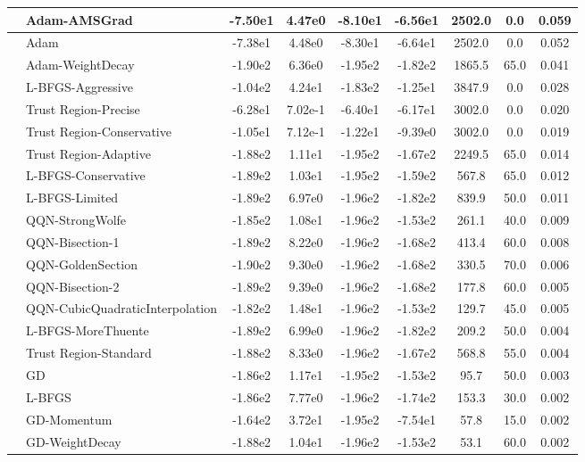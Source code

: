 \documentclass{article}
\begin{document}
\begin{longtable}{|l|l|c|c|c|c|c|c|c|}
\hline
 & Adam-AMSGrad & -7.50e1 & 4.47e0 & -8.10e1 & -6.56e1 & 2502.0 & 0.0 & 0.059 \\
\hline
 & Adam & -7.38e1 & 4.48e0 & -8.30e1 & -6.64e1 & 2502.0 & 0.0 & 0.052 \\
\hline
 & Adam-WeightDecay & -1.90e2 & 6.36e0 & -1.95e2 & -1.82e2 & 1865.5 & 65.0 & 0.041 \\
\hline
 & L-BFGS-Aggressive & -1.04e2 & 4.24e1 & -1.83e2 & -1.25e1 & 3847.9 & 0.0 & 0.028 \\
\hline
 & Trust Region-Precise & -6.28e1 & 7.02e-1 & -6.40e1 & -6.17e1 & 3002.0 & 0.0 & 0.020 \\
\hline
 & Trust Region-Conservative & -1.05e1 & 7.12e-1 & -1.22e1 & -9.39e0 & 3002.0 & 0.0 & 0.019 \\
\hline
 & Trust Region-Adaptive & -1.88e2 & 1.11e1 & -1.95e2 & -1.67e2 & 2249.5 & 65.0 & 0.014 \\
\hline
 & L-BFGS-Conservative & -1.89e2 & 1.03e1 & -1.95e2 & -1.59e2 & 567.8 & 65.0 & 0.012 \\
\hline
 & L-BFGS-Limited & -1.89e2 & 6.97e0 & -1.96e2 & -1.82e2 & 839.9 & 50.0 & 0.011 \\
\hline
 & QQN-StrongWolfe & -1.85e2 & 1.08e1 & -1.96e2 & -1.53e2 & 261.1 & 40.0 & 0.009 \\
\hline
 & QQN-Bisection-1 & -1.89e2 & 8.22e0 & -1.96e2 & -1.68e2 & 413.4 & 60.0 & 0.008 \\
\hline
 & QQN-GoldenSection & -1.90e2 & 9.30e0 & -1.96e2 & -1.68e2 & 330.5 & 70.0 & 0.006 \\
\hline
 & QQN-Bisection-2 & -1.89e2 & 9.39e0 & -1.96e2 & -1.68e2 & 177.8 & 60.0 & 0.005 \\
\hline
 & QQN-CubicQuadraticInterpolation & -1.82e2 & 1.48e1 & -1.96e2 & -1.53e2 & 129.7 & 45.0 & 0.005 \\
\hline
 & L-BFGS-MoreThuente & -1.89e2 & 6.99e0 & -1.96e2 & -1.82e2 & 209.2 & 50.0 & 0.004 \\
\hline
 & Trust Region-Standard & -1.88e2 & 8.33e0 & -1.96e2 & -1.67e2 & 568.8 & 55.0 & 0.004 \\
\hline
 & GD & -1.86e2 & 1.17e1 & -1.95e2 & -1.53e2 & 95.7 & 50.0 & 0.003 \\
\hline
 & L-BFGS & -1.86e2 & 7.77e0 & -1.96e2 & -1.74e2 & 153.3 & 30.0 & 0.002 \\
\hline
 & GD-Momentum & -1.64e2 & 3.72e1 & -1.95e2 & -7.54e1 & 57.8 & 15.0 & 0.002 \\
\hline
 & GD-WeightDecay & -1.88e2 & 1.04e1 & -1.96e2 & -1.53e2 & 53.1 & 60.0 & 0.002 \\

\end{longtable}
\end{document}
